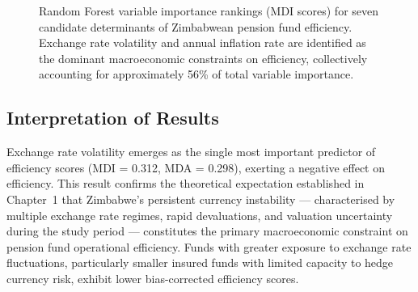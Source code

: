 \documentclass[12pt,a4paper]{article}
\begin{document}
\begin{figure}[H]
\centering
{}
\caption{Random Forest variable importance rankings (MDI scores) for seven candidate determinants of Zimbabwean pension fund efficiency. Exchange rate volatility and annual inflation rate are identified as the dominant macroeconomic constraints on efficiency, collectively accounting for approximately 56\% of total variable importance.}
\label{fig:rf_importance}
\end{figure}

\subsection{Interpretation of Results}

Exchange rate volatility emerges as the single most important predictor of efficiency scores (MDI = 0.312, MDA = 0.298), exerting a negative effect on efficiency. This result confirms the theoretical expectation established in Chapter~1 that Zimbabwe's persistent currency instability --- characterised by multiple exchange rate regimes, rapid devaluations, and valuation uncertainty during the study period --- constitutes the primary macroeconomic constraint on pension fund operational efficiency. Funds with greater exposure to exchange rate fluctuations, particularly smaller insured funds with limited capacity to hedge currency risk, exhibit lower bias-corrected efficiency scores.
\end{document}
